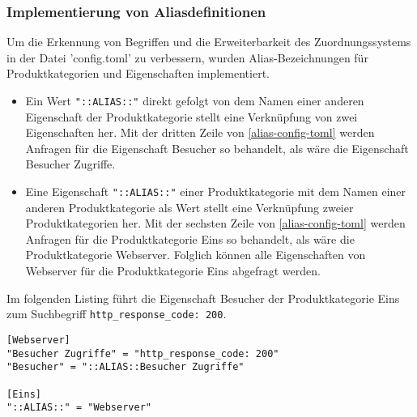 \subsubsection{Implementierung von Aliasdefinitionen}
\label{sec:aliasdef}

Um die Erkennung von Begriffen und die Erweiterbarkeit des Zuordnungssystems in der Datei 'config.toml' zu verbessern, wurden Alias-Bezeichnungen für Produktkategorien und Eigenschaften implementiert. 

\begin{itemize}
\item Ein Wert \lstinline{"::ALIAS::"} direkt gefolgt von dem Namen einer anderen Eigenschaft der Produktkategorie stellt eine Verknüpfung von zwei Eigenschaften her. Mit der dritten Zeile von \autoref{alias-config-toml} werden Anfragen für die Eigenschaft Besucher so behandelt, als wäre die Eigenschaft Besucher Zugriffe.
\item Eine Eigenschaft \lstinline{"::ALIAS::"} einer Produktkategorie mit dem Namen einer anderen Produktkategorie als Wert stellt eine Verknüpfung zweier Produktkategorien her. Mit der sechsten Zeile  von \autoref{alias-config-toml} werden Anfragen für die Produktkategorie Eins so behandelt, als wäre die Produktkategorie Webserver. Folglich können alle Eigenschaften von Webserver für die Produktkategorie Eins abgefragt werden.
\end{itemize}

Im folgenden Listing führt die Eigenschaft Besucher der Produktkategorie Eins zum Suchbegriff \lstinline{http_response_code: 200}.

\begin{lstlisting}[caption={Aliasdefinitionen in der Datei config.toml}, label=alias-config-toml, xleftmargin=6mm]
[Webserver]
"Besucher Zugriffe" = "http_response_code: 200"
"Besucher" = "::ALIAS::Besucher Zugriffe"

[Eins]
"::ALIAS::" = "Webserver"
\end{lstlisting}
